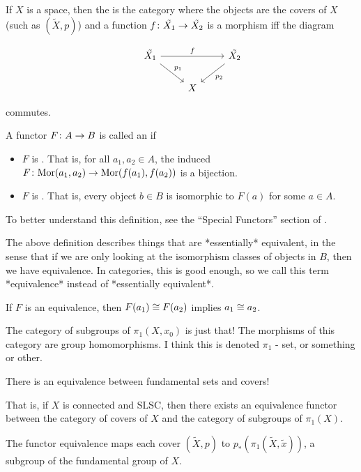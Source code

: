 \documentclass[11pt,leqno,oneside]{amsart}
\numberwithin{thm}{section}
\newcommand{\fund}[1][1]{\pi_{#1}}
\newcommand{\Mor}{\text{Mor}}
\begin{document}
\begin{defn}
  If $X$ is a space, then the  is the category where the objects are the covers of $X$ (such as $(\tilde{X}, p)$) and a function $f \colon \tilde{X_1} \to \tilde{X_2}$ is a morphism iff the diagram

  $$\begin{tikzcd}
    &\tilde{X_1} \arrow[rd, "p_1"] \arrow[rr, "f"] &&\tilde{X_2} \arrow[ld, "p_2"] \\
    &&X
  \end{tikzcd}$$

  commutes.
\end{defn}
\begin{defn}
  A functor $F \colon A \to B$ is called an  if
  \begin{itemize}
    \item $F$ is .  That is, for all $a_1, a_2 \in A$, the induced $F\from \Mor(a_1, a_2) \to \Mor(f(a_1), f(a_2))$ is a bijection.
    \item $F$ is .  That is, every object $b \in B$ is isomorphic to $F(a)$ for some $a \in A$.
  \end{itemize}
\end{defn}
\begin{rmk}
  To better understand this definition, see the ``Special Functors'' section of \cite{functors}.

  The above definition describes things that are *essentially* equivalent, in the sense that if we are only looking at the isomorphism classes of objects in $B$, then we have equivalence.  In categories, this is good enough, so we call this term *equivalence* instead of *essentially equivalent*.
\end{rmk}
\begin{rmk}
  If $F$ is an equivalence, then $F(a_1) \mathrel{\cong} F(a_2)$ implies $a_1 \mathrel{\cong} a_2$.
\end{rmk}

\begin{defn}
  The {category of subgroups of $\fund(X, x_0)$} is just that!  The morphisms of this category are group homomorphisms.  I think this is denoted $\fund$ - set, or something or other.
\end{defn}

\begin{thm}
  There is an equivalence between fundamental sets and covers!

  That is, if $X$ is connected and SLSC, then there exists an equivalence functor between the category of covers of $X$ and the category of subgroups of $\fund(X)$.

  The functor equivalence maps each cover $(\tilde{X}, p)$ to $p_*(\fund(\tilde{X}, \tilde{x}))$, a subgroup of the fundamental group of $X$.
\end{thm}
\end{document}
